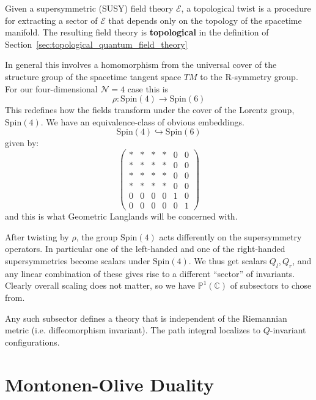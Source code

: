 	\begin{defn}
		Given a supersymmetric (SUSY) field theory $\mathcal E$, a topological twist is a procedure for extracting a sector of $\mathcal E$ that depends only on the topology of the spacetime manifold. The resulting field theory is \textbf{topological} in the definition of Section~\ref{sec:topological_quantum_field_theory}
	\end{defn}
	In general this involves a homomorphism from the universal cover of the structure group of the spacetime tangent space $TM$ to the R-symmetry group. For our four-dimensional $\mathcal N = 4$ case this is
	$$\rho : \mathrm{Spin}(4) \to \mathrm{Spin}(6)$$
	This redefines how the fields transform under the cover of the Lorentz group, $\mathrm{Spin}(4)$. We have an equivalence-class of obvious embeddings.
	$$\mathrm{Spin}(4) \hookrightarrow \mathrm{Spin}(6)$$
	given by:
	\[
		\begin{pmatrix}
			* & * & * & * & 0 & 0 \\
			* & * & * & * & 0 & 0 \\
			* & * & * & * & 0 & 0 \\
			* & * & * & * & 0 & 0 \\
			0 & 0 & 0 & 0 & 1 & 0 \\
			0 & 0 & 0 & 0 & 0 & 1
		\end{pmatrix}
	\]
	and this is what Geometric Langlands will be concerned with.
	
	After twisting by $\rho$, the group $\mathrm{Spin}(4)$ acts differently on the supersymmetry operators. In particular one of the left-handed and one of the right-handed supersymmetries become scalars under $\mathrm{Spin}(4)$. We thus get scalars $Q_l, Q_r$, and any linear combination of these gives rise to a different ``sector'' of invariants. Clearly overall scaling does not matter, so we have $\mathbb P^1 (\mathbb C)$ of subsectors to chose from.
	
	\begin{prop}
		Any such subsector defines a theory that is independent of the Riemannian metric (i.e. diffeomorphism invariant). The path integral localizes to $Q$-invariant configurations.
	\end{prop}


\section{Montonen-Olive Duality} %
\label{sec:montonen_olive_duality}

